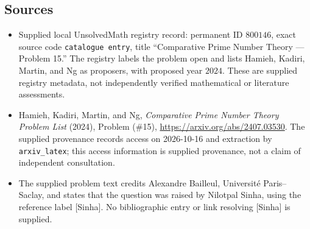 \documentclass[11pt]{article}
\begin{document}
\subsection{Sources}
\begin{itemize}
\item Supplied local UnsolvedMath registry record: permanent ID \(800146\), exact source code \texttt{catalogue entry}, title ``Comparative Prime Number Theory --- Problem 15.'' The registry labels the problem open and lists Hamieh, Kadiri, Martin, and Ng as proposers, with proposed year \(2024\). These are supplied registry metadata, not independently verified mathematical or literature assessments.
\item Hamieh, Kadiri, Martin, and Ng, \emph{Comparative Prime Number Theory Problem List} (2024), Problem (\#15), \url{https://arxiv.org/abs/2407.03530}. The supplied provenance records access on 2026-10-16 and extraction by \texttt{arxiv\_latex}; this access information is supplied provenance, not a claim of independent consultation.
\item The supplied problem text credits Alexandre Bailleul, Universit\'e Paris--Saclay, and states that the question was raised by Nilotpal Sinha, using the reference label [Sinha]. No bibliographic entry or link resolving [Sinha] is supplied.
\end{itemize}
\end{document}
